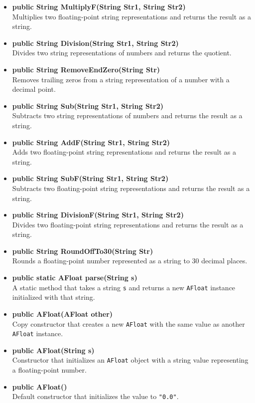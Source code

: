 \documentclass{article}
\begin{document}
\begin{itemize}
\item \textbf{public String MultiplyF(String Str1, String Str2)} \\
Multiplies two floating-point string representations and returns the result as a string.

\item \textbf{public String Division(String Str1, String Str2)} \\
Divides two string representations of numbers and returns the quotient.

\item \textbf{public String RemoveEndZero(String Str)} \\
Removes trailing zeros from a string representation of a number with a decimal point.

\item \textbf{public String Sub(String Str1, String Str2)} \\
Subtracts two string representations of numbers and returns the result as a string.

\item \textbf{public String AddF(String Str1, String Str2)} \\
Adds two floating-point string representations and returns the result as a string.

\item \textbf{public String SubF(String Str1, String Str2)} \\
Subtracts two floating-point string representations and returns the result as a string.

\item \textbf{public String DivisionF(String Str1, String Str2)} \\
Divides two floating-point string representations and returns the result as a string.

\item \textbf{public String RoundOffTo30(String Str)} \\
Rounds a floating-point number represented as a string to 30 decimal places.

\item \textbf{public static AFloat parse(String s)} \\
A static method that takes a string \texttt{s} and returns a new \texttt{AFloat} instance initialized with that string.

\item \textbf{public AFloat(AFloat other)} \\
Copy constructor that creates a new \texttt{AFloat} with the same value as another \texttt{AFloat} instance.

\item \textbf{public AFloat(String s)} \\
Constructor that initializes an \texttt{AFloat} object with a string value representing a floating-point number.

\item \textbf{public AFloat()} \\
Default constructor that initializes the value to \texttt{"0.0"}.

\end{itemize}
\end{document}
